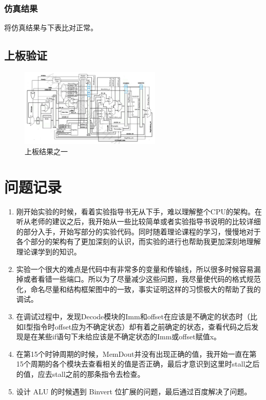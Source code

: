 \documentclass{../source/Experiment}
\begin{document}
            \subsubsection{仿真结果}
            将仿真结果与下表比对正常。
        \subsection{上板验证}
            \begin{figure}
                \centering
                \includegraphics[width = 0.6\textwidth]{cpu.png}
                \caption{上板结果之一}
            \end{figure}
    \section{问题记录}
        \begin{enumerate}
            \item 刚开始实验的时候，看着实验指导书无从下手，难以理解整个CPU的架构。在听从老师的建议之后，我开始从一些比较简单或者实验指导书说明的比较详细的部分入手，开始写部分的实验代码。同时随着理论课程的学习，慢慢地对于各个部分的架构有了更加深刻的认识，而实验的进行也帮助我更加深刻地理解理论课学到的知识。
            \item 实验一个很大的难点是代码中有非常多的变量和传输线，所以很多时候容易漏掉或者看错一些端口。所以为了尽量减少这些问题，我尽量使代码的格式规范化，命名尽量和结构框架图中的一致，事实证明这样的习惯极大的帮助了我的调试。
            \item 在调试过程中，发现Decode模块的Imm和offset在应该是不确定的状态时（比如I型指令时offset应为不确定状态）却有着之前确定的状态，查看代码之后发现是在某些if语句下未给应该是不确定状态的Imm或offset赋值x。
            \item 在第15个时钟周期的时候，MemDout并没有出现正确的值，我开始一直在第15个周期的各个模块去查看相关的值是否正确，最后才意识到这里时stall之后的值，应去stall之前的那条指令去检查。
            \item 设计 ALU 的时候遇到 Binvert 位扩展的问题，最后通过百度解决了问题。
        \end{enumerate}
\end{document}
